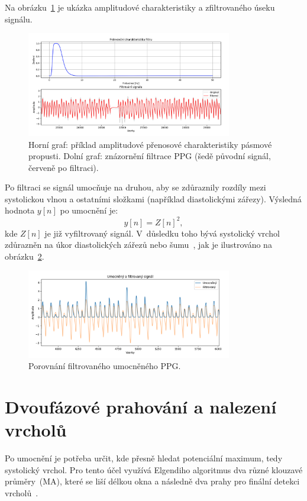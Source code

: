 Na obrázku~\ref{fig:filter-example} je ukázka amplitudové charakteristiky a zfiltrovaného úseku signálu.

\begin{figure}[htbp]
	\centering
	\includegraphics[width=0.8\textwidth]{./obrazky/ElgendiBandpass.png}
	\caption[Filtrace PPG signálu]{Horní graf: příklad amplitudové přenosové charakteristiky pásmové propusti. Dolní graf: znázornění filtrace PPG (šedě původní signál, červeně po filtraci).}
	\label{fig:filter-example}
\end{figure}

Po filtraci se signál umocňuje na druhou, aby se zdůraznily rozdíly mezi systolickou vlnou a ostatními složkami (například diastolickými zářezy).
Výsledná hodnota $y[n]$ po umocnění je:
\begin{equation}
	y[n] = Z[n]^2,
	\label{eq:square}
\end{equation}
kde $Z[n]$ je již vyfiltrovaný signál.
V~důsledku toho bývá systolický vrchol zdůrazněn na úkor diastolických zářezů nebo šumu~\cite{Elgendi2013}, jak je ilustrováno na obrázku~\ref{fig:squared-signal}.

\begin{figure}[htbp]
	\centering
	\includegraphics[width=0.8\textwidth]{./obrazky/ElgendiUpravenySignal.png}
	\caption[Umocněný a filtrovaný PPG]{Porovnání filtrovaného umocněného PPG.}
	\label{fig:squared-signal}
\end{figure}

\section{Dvoufázové prahování a nalezení vrcholů}
Po umocnění je potřeba určit, kde přesně hledat potenciální maximum, tedy systolický vrchol.
Pro tento účel využívá Elgendiho algoritmus dva různé klouzavé průměry~(\acs{MA}), které se liší délkou okna a následně dva prahy pro finální detekci vrcholů~\cite{Elgendi2013}.

